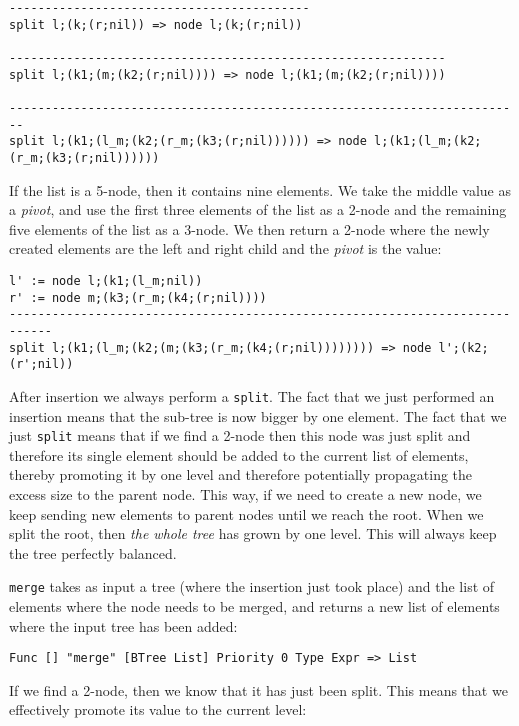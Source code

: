 \begin{lstlisting}
------------------------------------------
split l;(k;(r;nil)) => node l;(k;(r;nil))

-------------------------------------------------------------
split l;(k1;(m;(k2;(r;nil)))) => node l;(k1;(m;(k2;(r;nil))))

------------------------------------------------------------------------
split l;(k1;(l_m;(k2;(r_m;(k3;(r;nil)))))) => node l;(k1;(l_m;(k2;(r_m;(k3;(r;nil))))))
\end{lstlisting}

If the list is a 5-node, then it contains nine elements. We take the middle value as a \textit{pivot}, and use the first three elements of the list as a 2-node and the remaining five elements of the list as a 3-node. We then return a 2-node where the newly created elements are the left and right child and the \textit{pivot} is the value:

\begin{lstlisting}
l' := node l;(k1;(l_m;nil))
r' := node m;(k3;(r_m;(k4;(r;nil))))
----------------------------------------------------------------------------
split l;(k1;(l_m;(k2;(m;(k3;(r_m;(k4;(r;nil)))))))) => node l';(k2;(r';nil))
\end{lstlisting}


After insertion we always perform a \texttt{split}. The fact that we just performed an insertion means that the sub-tree is now bigger by one element. The fact that we just \texttt{split} means that if we find a 2-node then this node was just split and therefore its single element should be added to the current list of elements, thereby promoting it by one level and therefore potentially propagating the excess size to the parent node. This way, if we need to create a new node, we keep sending new elements to parent nodes until we reach the root. When we split the root, then \textit{the whole tree} has grown by one level. This will always keep the tree perfectly balanced.

\texttt{merge} takes as input a tree (where the insertion just took place) and the list of elements where the node needs to be merged, and returns a new list of elements where the input tree has been added:

\begin{lstlisting}
Func [] "merge" [BTree List] Priority 0 Type Expr => List
\end{lstlisting}

If we find a 2-node, then we know that it has just been split. This means that we effectively promote its value to the current level:

